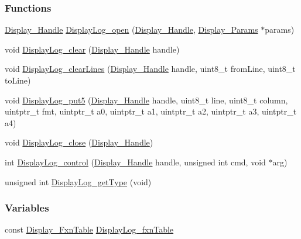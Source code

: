\subsubsection*{Functions}
\begin{DoxyCompactItemize}
\item 
\hyperlink{_display_8h_a045a26811755aabf1886d982c49e54ab}{Display\+\_\+\+Handle} \hyperlink{_display_log_8h_abf731b96ea43adde1aba4000c8eb614a}{Display\+Log\+\_\+open} (\hyperlink{_display_8h_a045a26811755aabf1886d982c49e54ab}{Display\+\_\+\+Handle}, \hyperlink{struct_display___params}{Display\+\_\+\+Params} $\ast$params)
\item 
void \hyperlink{_display_log_8h_a2ea41286142e75987158d5ad8e17e71d}{Display\+Log\+\_\+clear} (\hyperlink{_display_8h_a045a26811755aabf1886d982c49e54ab}{Display\+\_\+\+Handle} handle)
\item 
void \hyperlink{_display_log_8h_ab5bdbb87cfda5be2d4c3d2f5a1bac384}{Display\+Log\+\_\+clear\+Lines} (\hyperlink{_display_8h_a045a26811755aabf1886d982c49e54ab}{Display\+\_\+\+Handle} handle, uint8\+\_\+t from\+Line, uint8\+\_\+t to\+Line)
\item 
void \hyperlink{_display_log_8h_a150098057f22e8f081f20786079997bc}{Display\+Log\+\_\+put5} (\hyperlink{_display_8h_a045a26811755aabf1886d982c49e54ab}{Display\+\_\+\+Handle} handle, uint8\+\_\+t line, uint8\+\_\+t column, uintptr\+\_\+t fmt, uintptr\+\_\+t a0, uintptr\+\_\+t a1, uintptr\+\_\+t a2, uintptr\+\_\+t a3, uintptr\+\_\+t a4)
\item 
void \hyperlink{_display_log_8h_aa671ad02c2071f28a8af3015355f4f33}{Display\+Log\+\_\+close} (\hyperlink{_display_8h_a045a26811755aabf1886d982c49e54ab}{Display\+\_\+\+Handle})
\item 
int \hyperlink{_display_log_8h_a71c685185da34644fa9967c12f799ace}{Display\+Log\+\_\+control} (\hyperlink{_display_8h_a045a26811755aabf1886d982c49e54ab}{Display\+\_\+\+Handle} handle, unsigned int cmd, void $\ast$arg)
\item 
unsigned int \hyperlink{_display_log_8h_ad67682b1f6dcd757131df4b515b5c499}{Display\+Log\+\_\+get\+Type} (void)
\end{DoxyCompactItemize}
\subsubsection*{Variables}
\begin{DoxyCompactItemize}
\item 
const \hyperlink{struct_display___fxn_table}{Display\+\_\+\+Fxn\+Table} \hyperlink{_display_log_8h_a9b47109421eb742bcadbb6e5d33654cd}{Display\+Log\+\_\+fxn\+Table}
\end{DoxyCompactItemize}


